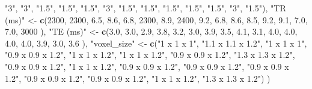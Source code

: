 \documentclass[
]{article}
\newenvironment{Shaded}{\begin{snugshade}}{\end{snugshade}}
\newcommand{\DecValTok}[1]{\textcolor[rgb]{0.00,0.00,0.81}{#1}}
\newcommand{\FloatTok}[1]{\textcolor[rgb]{0.00,0.00,0.81}{#1}}
\newcommand{\KeywordTok}[1]{\textcolor[rgb]{0.13,0.29,0.53}{\textbf{#1}}}
\newcommand{\NormalTok}[1]{#1}
\newcommand{\StringTok}[1]{\textcolor[rgb]{0.31,0.60,0.02}{#1}}
\begin{document}
\begin{Shaded}
\begin{Highlighting}[]
                                            \StringTok{"3"}\NormalTok{, }\StringTok{"3"}\NormalTok{, }\StringTok{"1.5"}\NormalTok{, }\StringTok{"1.5"}\NormalTok{,}
                                            \StringTok{"1.5"}\NormalTok{, }\StringTok{"3"}\NormalTok{, }\StringTok{"1.5"}\NormalTok{, }\StringTok{"1.5"}\NormalTok{,}
                                            \StringTok{"1.5"}\NormalTok{, }\StringTok{"1.5"}\NormalTok{, }\StringTok{"1.5"}\NormalTok{, }\StringTok{"3"}\NormalTok{,}
                                            \StringTok{"1.5"}\NormalTok{),}
                               \StringTok{"TR (ms)"}\NormalTok{ <-}\StringTok{ }\KeywordTok{c}\NormalTok{(}\DecValTok{2300}\NormalTok{, }\DecValTok{2300}\NormalTok{, }\FloatTok{6.5}\NormalTok{, }\FloatTok{8.6}\NormalTok{,}
                                              \FloatTok{6.8}\NormalTok{, }\DecValTok{2300}\NormalTok{, }\FloatTok{8.9}\NormalTok{, }\DecValTok{2400}\NormalTok{,}
                                              \FloatTok{9.2}\NormalTok{, }\FloatTok{6.8}\NormalTok{, }\FloatTok{8.6}\NormalTok{, }\FloatTok{8.5}\NormalTok{,}
                                              \FloatTok{9.2}\NormalTok{, }\FloatTok{9.1}\NormalTok{, }\FloatTok{7.0}\NormalTok{, }\FloatTok{7.0}\NormalTok{,}
                                              \DecValTok{3000}
\NormalTok{                                              ),}
                               \StringTok{"TE (ms)"}\NormalTok{ <-}\StringTok{ }\KeywordTok{c}\NormalTok{(}\FloatTok{3.0}\NormalTok{, }\FloatTok{3.0}\NormalTok{, }\FloatTok{2.9}\NormalTok{, }\FloatTok{3.8}\NormalTok{,}
                                              \FloatTok{3.2}\NormalTok{, }\FloatTok{3.0}\NormalTok{, }\FloatTok{3.9}\NormalTok{, }\FloatTok{3.5}\NormalTok{,}
                                              \FloatTok{4.1}\NormalTok{, }\FloatTok{3.1}\NormalTok{, }\FloatTok{4.0}\NormalTok{, }\FloatTok{4.0}\NormalTok{,}
                                              \FloatTok{4.0}\NormalTok{, }\FloatTok{4.0}\NormalTok{, }\FloatTok{3.9}\NormalTok{, }\FloatTok{3.0}\NormalTok{,}
                                              \FloatTok{3.6}
\NormalTok{                                              ),}
              \StringTok{"voxel_size"}\NormalTok{ <-}\StringTok{ }\KeywordTok{c}\NormalTok{(}\StringTok{"1 x 1 x 1"}\NormalTok{, }\StringTok{"1.1 x 1.1 x 1.2"}\NormalTok{, }\StringTok{"1 x 1 x 1"}\NormalTok{, }\StringTok{"0.9 x 0.9 x 1.2"}\NormalTok{,}
                               \StringTok{"1 x 1 x 1.2"}\NormalTok{, }\StringTok{"1 x 1 x 1.2"}\NormalTok{, }\StringTok{"0.9 x 0.9 x 1.2"}\NormalTok{, }\StringTok{"1.3 x 1.3 x 1.2"}\NormalTok{,}
                        \StringTok{"0.9 x 0.9 x 1.2"}\NormalTok{, }\StringTok{"1 x 1 x 1.2"}\NormalTok{, }\StringTok{"0.9 x 0.9 x 1.2"}\NormalTok{, }\StringTok{"0.9 x 0.9 x 1.2"}\NormalTok{,}
                       \StringTok{"0.9 x 0.9 x 1.2"}\NormalTok{, }\StringTok{"0.9 x 0.9 x 1.2"}\NormalTok{, }\StringTok{"0.9 x 0.9 x 1.2"}\NormalTok{, }\StringTok{"1 x 1 x 1.2"}\NormalTok{,}
                                          \StringTok{"1.3 x 1.3 x 1.2"}\NormalTok{)}
\NormalTok{                               )}


\end{Highlighting}
\end{Shaded}
\end{document}
